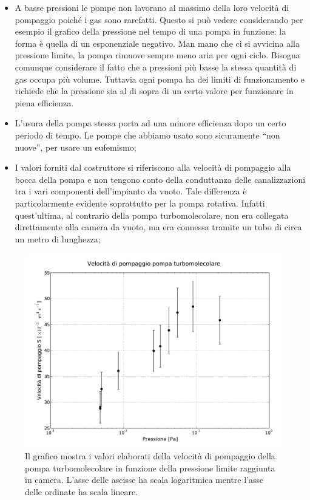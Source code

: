 \begin{itemize}
    \item{A basse pressioni le pompe non lavorano al massimo della loro velocità di pompaggio poiché i gas sono rarefatti.
        Questo si può vedere considerando per esempio il grafico della pressione nel tempo di una pompa in funzione:
        la forma è quella di un esponenziale negativo. Man mano che ci si avvicina alla pressione limite, la pompa rimuove
        sempre meno aria per ogni ciclo. Bisogna comunque considerare il fatto che a pressioni più basse la stessa quantità di gas
        occupa più volume. Tuttavia ogni pompa ha dei limiti di funzionamento e richiede che la pressione sia al di sopra di un
        certo valore per funzionare in piena efficienza.}
	\item{L'usura della pompa stessa porta ad una minore efficienza dopo un certo periodo di tempo. Le pompe che abbiamo
        usato sono sicuramente ``non nuove'', per usare un eufemismo;}
	\item{I valori forniti dal costruttore si riferiscono alla velocità di pompaggio alla bocca della pompa e non tengono
        conto della conduttanza delle canalizzazioni tra i vari componenti dell'impianto da vuoto. Tale differenza è
        particolarmente evidente soprattutto per la pompa rotativa. Infatti quest'ultima, al contrario della pompa
        turbomolecolare, non era collegata direttamente alla camera da vuoto, ma era connessa tramite un tubo di
        circa un metro di lunghezza;}
\end{itemize}

\begin{figure}[h!]
	\centering
		\includegraphics[width=145mm]{turbo.pdf}
	\caption{Il grafico mostra i valori elaborati della velocità di pompaggio della pompa turbomolecolare in funzione della pressione limite raggiunta in camera. L'asse delle ascisse ha scala logaritmica mentre l'asse delle ordinate ha scala lineare.}
		\label{fig:turbo}
\end{figure}

